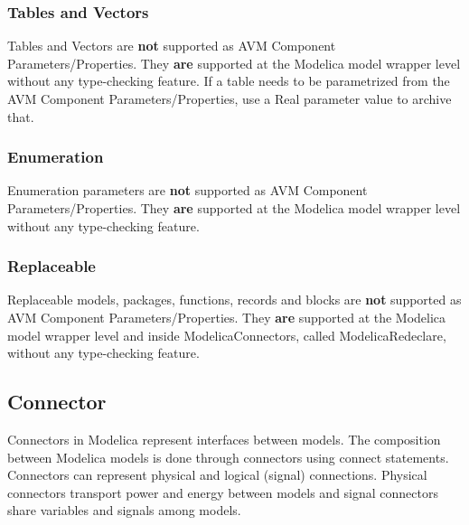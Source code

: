 \subsubsection{Tables and Vectors}
Tables and Vectors are \textbf{not} supported as AVM Component Parameters/Properties. They \textbf{are} supported at the Modelica model wrapper level without any type-checking feature. If a table needs to be parametrized from the AVM Component Parameters/Properties, use a Real parameter value to archive that.

\subsubsection{Enumeration}
Enumeration parameters are \textbf{not} supported as AVM Component Parameters/Properties. They \textbf{are} supported at the Modelica model wrapper level without any type-checking feature.




\subsubsection{Replaceable}
Replaceable models, packages, functions, records and blocks are \textbf{not} supported as AVM Component Parameters/Properties. They \textbf{are} supported at the Modelica model wrapper level and inside ModelicaConnectors, called ModelicaRedeclare, without any type-checking feature.


\subsection{Connector}

Connectors in Modelica represent interfaces between models. The composition between Modelica models is done through connectors using connect statements. Connectors can represent physical and logical (signal) connections. Physical connectors transport power and energy between models and signal connectors share variables and signals among models.

